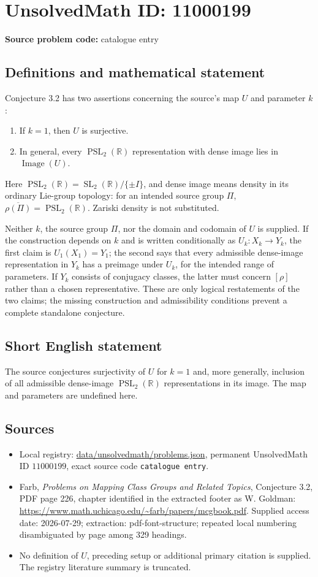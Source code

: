\documentclass[11pt]{article}
\newcommand{\R}{\mathbb{R}}
\begin{document}
\section*{UnsolvedMath ID: 11000199}
\textbf{Source problem code:} catalogue entry
\subsection{Definitions and mathematical statement}
Conjecture 3.2 has two assertions concerning the source's map $U$ and parameter $k$:
\begin{enumerate}
\item If $k=1$, then $U$ is surjective.
\item In general, every $\operatorname{PSL}_2(\R)$ representation with dense image lies in $\operatorname{Image}(U)$.
\end{enumerate}
Here $\operatorname{PSL}_2(\R)=\operatorname{SL}_2(\R)/\{\pm I\}$, and dense image means density in its ordinary Lie-group topology: for an intended source group $\Pi$, $\overline{\rho(\Pi)}=\operatorname{PSL}_2(\R)$. Zariski density is not substituted.

Neither $k$, the source group $\Pi$, nor the domain and codomain of $U$ is supplied. If the construction depends on $k$ and is written conditionally as $U_k:X_k\to Y_k$, the first claim is $U_1(X_1)=Y_1$; the second says that every admissible dense-image representation in $Y_k$ has a preimage under $U_k$, for the intended range of parameters. If $Y_k$ consists of conjugacy classes, the latter must concern $[\rho]$ rather than a chosen representative. These are only logical restatements of the two claims; the missing construction and admissibility conditions prevent a complete standalone conjecture.
\subsection{Short English statement}
The source conjectures surjectivity of $U$ for $k=1$ and, more generally, inclusion of all admissible dense-image $\operatorname{PSL}_2(\R)$ representations in its image. The map and parameters are undefined here.
\subsection{Sources}
\begin{itemize}
\item Local registry: \url{data/unsolvedmath/problems.json}, permanent UnsolvedMath ID $11000199$, exact source code \texttt{catalogue entry}.
\item Farb, \emph{Problems on Mapping Class Groups and Related Topics}, Conjecture 3.2, PDF page 226, chapter identified in the extracted footer as W. Goldman: \url{https://www.math.uchicago.edu/~farb/papers/mcgbook.pdf}. Supplied access date: 2026-07-29; extraction: pdf-font-structure; repeated local numbering disambiguated by page among 329 headings.
\item No definition of $U$, preceding setup or additional primary citation is supplied. The registry literature summary is truncated.
\end{itemize}
\end{document}
